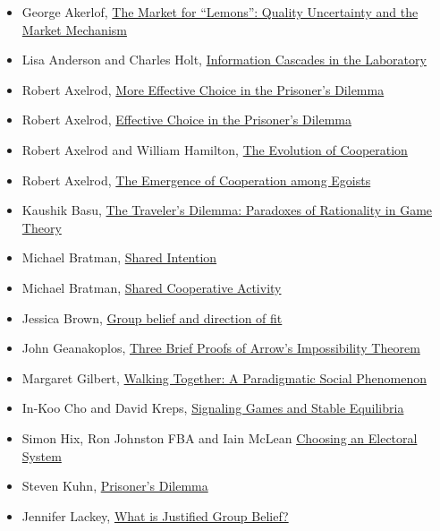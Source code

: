 \documentclass[
  12pt,
  letterpaper,
  DIV=11,
  numbers=noendperiod]{scrartcl}
\providecommand{\tightlist}{%
  \setlength{\itemsep}{0pt}\setlength{\parskip}{0pt}}\usepackage{longtable,booktabs,array}
\begin{document}
\begin{itemize}
\tightlist
\item
  George Akerlof, \href{https://www.jstor.org/stable/1879431}{The Market
  for ``Lemons'': Quality Uncertainty and the Market Mechanism}
\item
  Lisa Anderson and Charles Holt,
  \href{https://www.jstor.org/stable/2951328}{Information Cascades in
  the Laboratory}
\item
  Robert Axelrod, \href{https://www.jstor.org/stable/173638}{More
  Effective Choice in the Prisoner's Dilemma}
\item
  Robert Axelrod, \href{https://www.jstor.org/stable/173932}{Effective
  Choice in the Prisoner's Dilemma}
\item
  Robert Axelrod and William Hamilton,
  \href{https://www.jstor.org/stable/1685895}{The Evolution of
  Cooperation}
\item
  Robert Axelrod, \href{https://www.jstor.org/stable/1961366}{The
  Emergence of Cooperation among Egoists}
\item
  Kaushik Basu, \href{https://www.jstor.org/stable/2117865}{The
  Traveler's Dilemma: Paradoxes of Rationality in Game Theory}
\item
  Michael Bratman, \href{https://philpapers.org/rec/BRASI}{Shared
  Intention}
\item
  Michael Bratman, \href{https://philpapers.org/rec/BRASCA}{Shared
  Cooperative Activity}
\item
  Jessica Brown, \href{https://philpapers.org/rec/BROGBA-3}{Group belief
  and direction of fit}
\item
  John Geanakoplos, \href{https://www.jstor.org/stable/25055941}{Three
  Brief Proofs of Arrow's Impossibility Theorem}
\item
  Margaret Gilbert, \href{https://philpapers.org/rec/GILWTA}{Walking
  Together: A Paradigmatic Social Phenomenon}
\item
  In-Koo Cho and David Kreps,
  \href{https://www.jstor.org/stable/1885060}{Signaling Games and Stable
  Equilibria}
\item
  Simon Hix, Ron Johnston FBA and Iain McLean
  \href{https://www.thebritishacademy.ac.uk/publications/choosing-electoral-system/}{Choosing
  an Electoral System}
\item
  Steven Kuhn,
  \href{https://plato.stanford.edu/entries/prisoner-dilemma/}{Prisoner's
  Dilemma}
\item
  Jennifer Lackey, \href{https://philpapers.org/rec/LACWIJ}{What is
  Justified Group Belief?}

\end{itemize}
\end{document}
